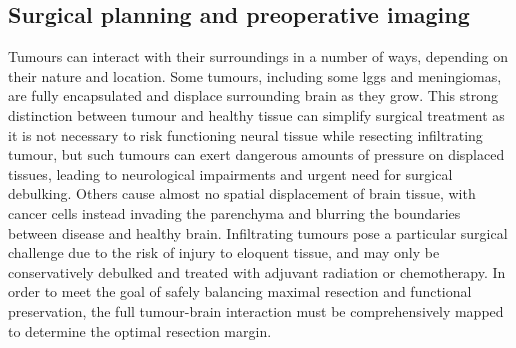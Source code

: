 
\subsection{Surgical planning and preoperative imaging}

Tumours can interact with their surroundings in a number of ways, depending on their nature and location.
Some tumours, including some \glspl{lgg} and meningiomas, are fully encapsulated and displace surrounding brain as they grow.
This strong distinction between tumour and healthy tissue can simplify surgical treatment as it is not necessary to risk functioning neural tissue while resecting infiltrating tumour, but such tumours can exert dangerous amounts of pressure on displaced tissues, leading to neurological impairments and urgent need for surgical debulking.
Others cause almost no spatial displacement of brain tissue, with cancer cells instead invading the parenchyma and blurring the boundaries between disease and healthy brain.
Infiltrating tumours pose a particular surgical challenge due to the risk of injury to eloquent tissue, and may only be conservatively debulked and treated with adjuvant radiation or chemotherapy.
In order to meet the goal of safely balancing maximal resection and functional preservation, the full tumour-brain interaction must be comprehensively mapped to determine the optimal resection margin.


